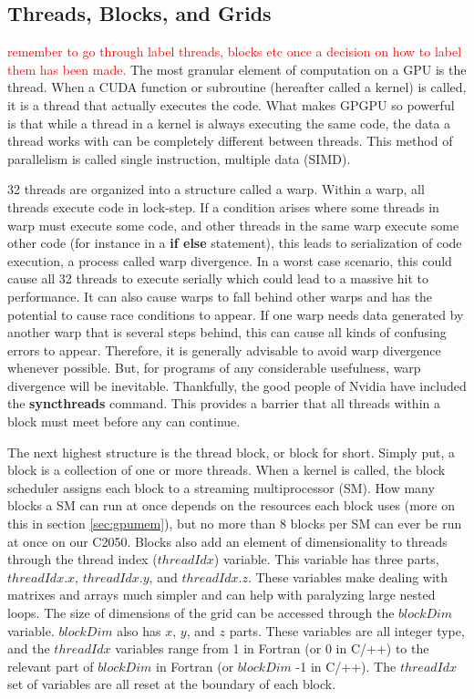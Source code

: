 \documentclass[12pt]{report}
\newcommand{\notetodylan}[1]{\textcolor{red}{#1}} %
\newcommand{\comm}[1]{\textbf{#1}}
\begin{document}
\subsection{Threads, Blocks, and Grids}\label{ThBlGr}
\notetodylan{remember to go through label threads, blocks etc once a decision on how to label them has been made.}
The most granular element of computation on a GPU is the thread. When a CUDA function or subroutine (hereafter called a kernel) is called, it is a thread that actually executes the code. What makes GPGPU so powerful is that while a thread in a kernel is always executing the same code, the data a thread works with can be completely different between threads. This method of parallelism is called single instruction, multiple data (SIMD). 

32 threads are organized into a structure called a warp. Within a warp, all threads execute code in lock-step. If a condition arises where some threads in warp must execute some code, and other threads in the same warp execute some other code (for instance in a \textbf{if else} statement), this leads to serialization of code execution, a process called warp divergence. In a worst case scenario, this could cause all 32 threads to execute serially which could lead to a massive hit to performance. It can also cause warps to fall behind other warps and has the potential to cause race conditions to appear. If one warp needs data generated by another warp that is several steps behind, this can cause all kinds of confusing errors to appear. Therefore, it is generally advisable to avoid warp divergence whenever possible. But, for programs of any considerable usefulness, warp divergence will be inevitable. Thankfully, the good people of Nvidia have included the \comm{syncthreads} command. This provides a barrier that all threads within a block must meet before any can continue. 

The next highest structure is the thread block, or block for short. Simply put, a block is a collection of one or more threads. When a kernel is called, the block scheduler assigns each block to a streaming multiprocessor (SM). How many blocks a SM can run at once depends on the resources each block uses (more on this in section \ref{sec:gpumem}), but no more than 8 blocks per SM can ever be run at once on our C2050. Blocks also add an element of dimensionality to threads through the thread index ($threadIdx$) variable. This variable has three parts, $threadIdx.x$, $threadIdx.y$, and $threadIdx.z$. These variables make dealing with matrixes and arrays much simpler and can help with paralyzing large nested loops. The size of dimensions of the grid can be accessed through the $blockDim$ variable. $blockDim$ also has $x$, $y$, and $z$ parts. These variables are all integer type, and the $threadIdx$ variables range from 1 in Fortran (or 0 in C/++) to the relevant part of $blockDim$ in Fortran (or $blockDim$ -1 in C/++). The $threadIdx$ set of variables are all reset at the boundary of each block. 
\end{document}
